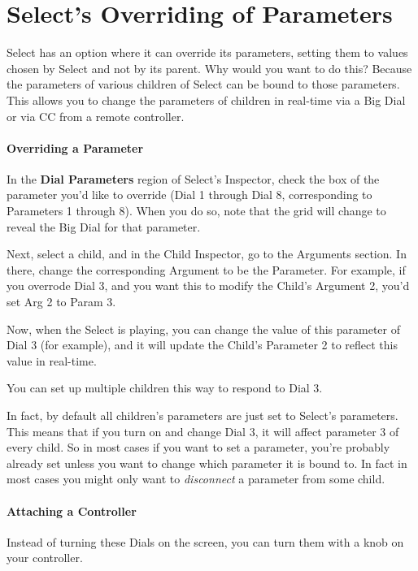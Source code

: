\documentclass[twoside,10pt]{article}
\begin{document}
\section{Select's Overriding of Parameters}

Select has an option where it can override its parameters, setting them to values chosen by Select and not by its parent.  Why would you want to do this?  Because the parameters of various children of Select can be bound to those parameters.  This allows you to change the parameters of children in real-time via a Big Dial or via CC from a remote controller.

\paragraph{Overriding a Parameter}

In the {\bf Dial Parameters} region of Select's Inspector, check the box of the parameter you'd like to override (Dial 1 through Dial 8, corresponding to Parameters 1 through 8).  When you do so, note that the grid will change to reveal the Big Dial for that parameter.

Next, select a child, and in the Child Inspector, go to the Arguments section.  In there, change the corresponding Argument to be the Parameter.  For example, if you overrode Dial 3, and you want this to modify the Child's Argument 2, you'd set Arg 2 to Param 3.  

Now, when the Select is playing, you can change the value of this parameter of Dial 3 (for example), and it will update the Child's Parameter 2 to reflect this value in real-time.

You can set up multiple children this way to respond to Dial 3.

In fact, by default all children's parameters are just set to Select's parameters.  This means that if you turn on and change Dial 3, it will affect parameter 3 of every child.  So in most cases if you want to set a parameter, you're probably already set unless you want to change which parameter it is bound to.  In fact in most cases you might only want to {\it disconnect} a parameter from some child.

\paragraph{Attaching a Controller}
Instead of turning these Dials on the screen, you can turn them with a knob on your controller.  
\end{document}
